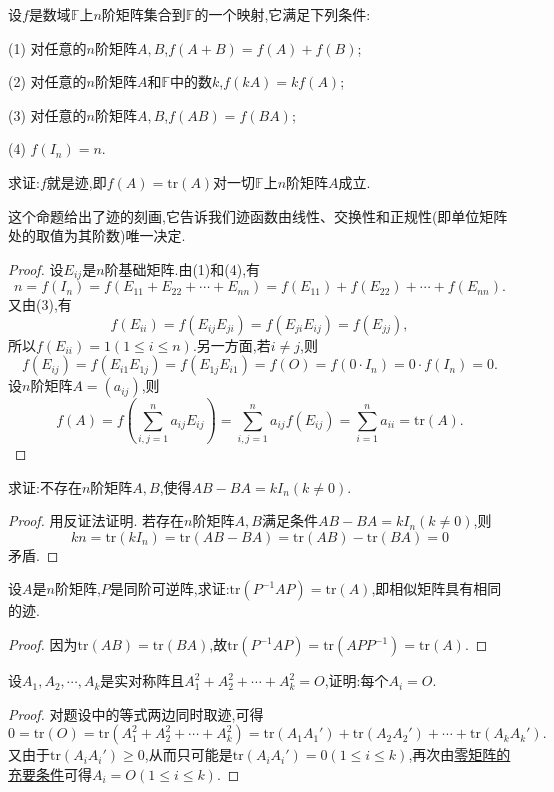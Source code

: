 \documentclass[lang=cn,newtx,10pt,scheme=chinese]{elegantbook}
\begin{document}
\begin{proposition}[矩阵迹的刻画]\label{proposition:矩阵迹的刻画}
    设\(f\)是数域\(\mathbb{F}\)上\(n\)阶矩阵集合到\(\mathbb{F}\)的一个映射,它满足下列条件:

(1) 对任意的\(n\)阶矩阵\(A,B\),\(f(A + B)=f(A)+f(B)\);

(2) 对任意的\(n\)阶矩阵\(A\)和\(\mathbb{F}\)中的数\(k\),\(f(kA)=kf(A)\);

(3) 对任意的\(n\)阶矩阵\(A,B\),\(f(AB)=f(BA)\);

(4) \(f(I_n)=n\).

求证:\(f\)就是迹,即\(f(A)=\mathrm{tr}(A)\)对一切\(\mathbb{F}\)上\(n\)阶矩阵\(A\)成立.
\end{proposition}
\begin{note}
    这个命题给出了迹的刻画,它告诉我们迹函数由线性、交换性和正规性(即单位矩阵处的取值为其阶数)唯一决定.
\end{note}
\begin{proof}
设\(E_{ij}\)是\(n\)阶基础矩阵.由(1)和(4),有
\[
n = f(I_n)=f(E_{11}+E_{22}+\cdots+E_{nn})=f(E_{11})+f(E_{22})+\cdots+f(E_{nn}).
\]
又由(3),有
\[
f(E_{ii})=f(E_{ij}E_{ji})=f(E_{ji}E_{ij})=f(E_{jj}),
\]
所以\(f(E_{ii}) = 1(1\leq i\leq n)\).另一方面,若\(i\neq j\),则
\[
f(E_{ij})=f(E_{i1}E_{1j})=f(E_{1j}E_{i1})=f(O)=f(0\cdot I_n)=0\cdot f(I_n)=0.
\]
设\(n\)阶矩阵\(A=(a_{ij})\),则
\[
f(A)=f\left(\sum_{i,j = 1}^{n}a_{ij}E_{ij}\right)=\sum_{i,j = 1}^{n}a_{ij}f(E_{ij})=\sum_{i = 1}^{n}a_{ii}=\mathrm{tr}(A).
\]
\end{proof}

\begin{example}
    求证:不存在\(n\)阶矩阵\(A,B\),使得\(AB - BA = kI_n(k\neq0)\).
\end{example}
\begin{proof}
用反证法证明. 若存在\(n\)阶矩阵\(A,B\)满足条件\(AB - BA = kI_n(k\neq0)\),则
\[
kn=\mathrm{tr}(kI_n)=\mathrm{tr}(AB - BA)=\mathrm{tr}(AB)-\mathrm{tr}(BA)=0
\]
矛盾.
\end{proof}

\begin{example}
设\(A\)是\(n\)阶矩阵,\(P\)是同阶可逆阵,求证:\(\mathrm{tr}(P^{-1}AP)=\mathrm{tr}(A)\),即相似矩阵具有相同的迹.
\end{example}
\begin{proof}
    因为\(\mathrm{tr}(AB)=\mathrm{tr}(BA)\),故\(\mathrm{tr}(P^{-1}AP)=\mathrm{tr}(APP^{-1})=\mathrm{tr}(A)\).
\end{proof}

\begin{example}
    设\(A_1,A_2,\cdots,A_k\)是实对称阵且\(A_1^2 + A_2^2+\cdots+A_k^2 = O\),证明:每个\(A_i = O\).
\end{example}
\begin{proof}
    对题设中的等式两边同时取迹,可得
\[
0=\mathrm{tr}(O)=\mathrm{tr}(A_1^2 + A_2^2+\cdots+A_k^2)=\mathrm{tr}(A_1A_1')+\mathrm{tr}(A_2A_2')+\cdots+\mathrm{tr}(A_kA_k').
\]
又由于\(\mathrm{tr}(A_iA_i')\geq0\),从而只可能是\(\mathrm{tr}(A_iA_i') = 0(1\leq i\leq k)\),再次由\hyperref[proposition:零矩阵的充要条件]{零矩阵的充要条件}可得\(A_i = O(1\leq i\leq k)\).
\end{proof}
\end{document}
